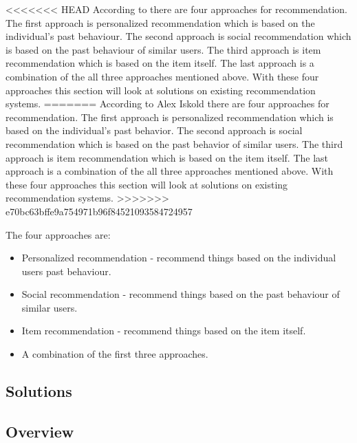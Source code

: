 <<<<<<< HEAD
According to \cite{ReadWrite} there are four approaches for recommendation. The first approach is personalized recommendation which is based on the individual’s past behaviour. The second approach is social recommendation which is based on the past behaviour of similar users. The third approach is item recommendation which is based on the item itself. The last approach is a combination of the all three approaches mentioned above. With these four approaches this section will look at solutions on existing recommendation systems.
=======
According to Alex Iskold \cite{ReadWrite} there are four approaches for recommendation. The first approach is personalized recommendation which is based on the individual’s past behavior. The second approach is social recommendation which is based on the past behavior of similar users. The third approach is item recommendation which is based on the item itself. The last approach is a combination of the all three approaches mentioned above. With these four approaches this section will look at solutions on existing recommendation systems.
>>>>>>> e70bc63bffe9a754971b96f84521093584724957


The four approaches are:

\begin{itemize}
	\item Personalized recommendation - recommend things based on the individual users past behaviour. 
	\item Social recommendation - recommend things based on the past behaviour of similar users. 
	\item Item recommendation - recommend things based on the item itself.
	\item A combination of the first three approaches.
\end{itemize}

\subsection{Solutions}
\label{Solutions}

\subsection{Overview}
\label{SolutionOverview}

